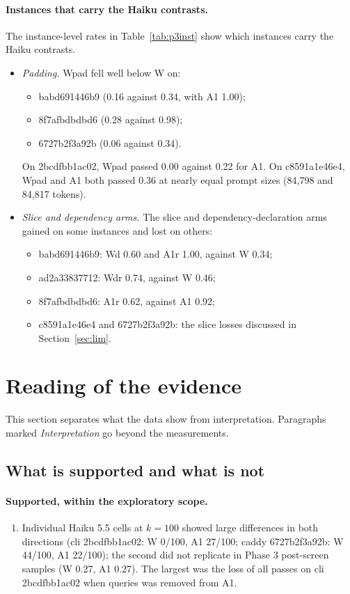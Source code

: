 \paragraph{Instances that carry the Haiku contrasts.} The instance-level rates in Table~\ref{tab:p3inst} show which instances carry the Haiku contrasts.
\begin{itemize}
\item \emph{Padding.} Wpad fell well below W on:
  \begin{itemize}
  \item babd691446b9 (0.16 against 0.34, with A1 1.00);
  \item 8f7afbdbdbd6 (0.28 against 0.98);
  \item 6727b2f3a92b (0.06 against 0.34).
  \end{itemize}
  On 2bcdfbb1ac02, Wpad passed 0.00 against 0.22 for A1. On c8591a1e46e4, Wpad and A1 both passed 0.36 at nearly equal prompt sizes (84,798 and 84,817 tokens).
\item \emph{Slice and dependency arms.} The slice and dependency-declaration arms gained on some instances and lost on others:
  \begin{itemize}
  \item babd691446b9: Wd 0.60 and A1r 1.00, against W 0.34;
  \item ad2a33837712: Wdr 0.74, against W 0.46;
  \item 8f7afbdbdbd6: A1r 0.62, against A1 0.92;
  \item c8591a1e46e4 and 6727b2f3a92b: the slice losses discussed in Section~\ref{sec:lim}.
  \end{itemize}
\end{itemize}

\section{Reading of the evidence}

This section separates what the data show from interpretation. Paragraphs marked \emph{Interpretation} go beyond the measurements.

\subsection{What is supported and what is not}

\paragraph{Supported, within the exploratory scope.}
\begin{enumerate}
\item Individual Haiku 5.5 cells at $k=100$ showed large differences in both directions (cli 2bcdfbb1ac02: W 0/100, A1 27/100; caddy 6727b2f3a92b: W 44/100, A1 22/100); the second did not replicate in Phase 3 post-screen samples (W 0.27, A1 0.27). The largest was the loss of all passes on cli 2bcdfbb1ac02 when queries was removed from A1.
\end{enumerate}

